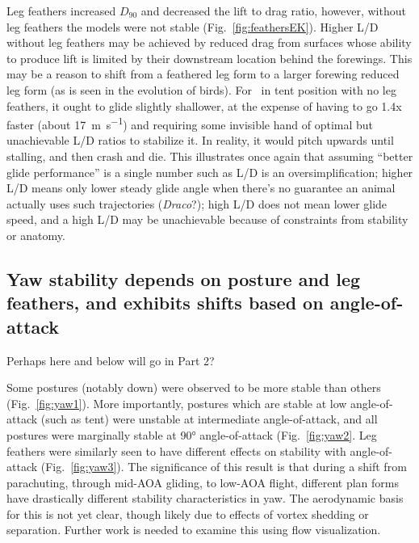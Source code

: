 Leg feathers increased $D_{90}$ and decreased the lift to drag ratio, however, without leg feathers the models were not stable (Fig.~\ref{fig:feathersEK}). Higher L/D without leg feathers may be achieved by reduced drag from surfaces whose ability to produce lift is limited by their downstream location behind the forewings.  This may be a reason to shift from a feathered leg form to a larger forewing reduced leg form (as is seen in the evolution of birds).  For \Mgui\ in tent position with no leg feathers, it ought to glide slightly shallower, at the expense of having to go 1.4x faster (about \SI{17}{\meter\per\second}) and requiring some invisible hand of optimal but unachievable L/D ratios to stabilize it.  In reality, it would pitch upwards until stalling, and then crash and die.  This illustrates once again that assuming ``better glide performance'' is a single number such as L/D is an oversimplification; higher L/D means only lower steady glide angle when there's no guarantee an animal actually uses such trajectories (\emph{Draco}?); high L/D does not mean lower glide speed, and a high L/D may be unachievable because of constraints from stability or anatomy.





 



\subsection{Yaw stability depends on posture and leg feathers, and exhibits shifts based on angle-of-attack}
Perhaps here and below will go in Part 2?

Some postures (notably down) were observed to be more stable than others (Fig.~\ref{fig:yaw1}).  More importantly, postures which are stable at low angle-of-attack (such as tent) were unstable at intermediate angle-of-attack, and all postures were marginally stable at \ang{90} angle-of-attack (Fig.~\ref{fig:yaw2}.  Leg feathers were similarly seen to have different effects on stability with angle-of-attack (Fig.~\ref{fig:yaw3}).  The significance of this result is that during a shift from parachuting, through mid-AOA gliding, to low-AOA flight, different plan forms have drastically different stability characteristics in yaw.  The aerodynamic basis for this is not yet clear, though likely due to effects of vortex shedding or separation.  Further work is needed to examine this using flow visualization. 

